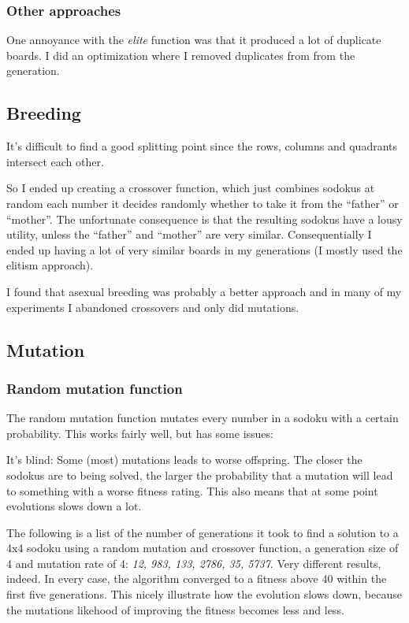 \documentclass{article}
\begin{document}
\subsubsection{Other approaches}

One annoyance with the \emph{elite} function was that it
produced a lot of duplicate boards. I did an optimization
where I removed duplicates from from the generation. 


\subsection{Breeding}

It's difficult to find a good splitting point since the
rows, columns and quadrants intersect each other.

So I ended up creating a crossover function, which just combines sodokus at
random each number it decides randomly whether to take it from 
the ``father'' or ``mother''. The unfortunate consequence is that 
the resulting sodokus have a lousy utility, unless the ``father'' and
``mother'' are very similar. Consequentially I ended up having a lot of very similar
boards in my generations (I mostly used the elitism approach). 

I found that asexual breeding was probably a better approach and
in many of my experiments I abandoned crossovers and only 
did mutations.

\subsection{Mutation}

\subsubsection{Random mutation function}

The random mutation function mutates every number in a sodoku
with a certain probability. This works fairly well, but has some
issues:

It's blind: Some (most) mutations leads to worse offspring.
The closer the sodokus are to being solved, the larger the 
probability that a mutation will lead to something with a worse
fitness rating. This also means that at some point evolutions
slows down a lot.

The following is a list of the number of generations it took
to find a solution to a 4x4 sodoku using a random mutation
and crossover function, a generation size of 4 and mutation 
rate of 4: \emph{12, 983, 133, 2786,  35, 5737}. Very different 
results, indeed. In every case, the algorithm converged to 
a fitness above 40 within the first five generations. This nicely
illustrate how the evolution slows down, because the mutations
likehood of improving the fitness becomes less and less.
\end{document}

